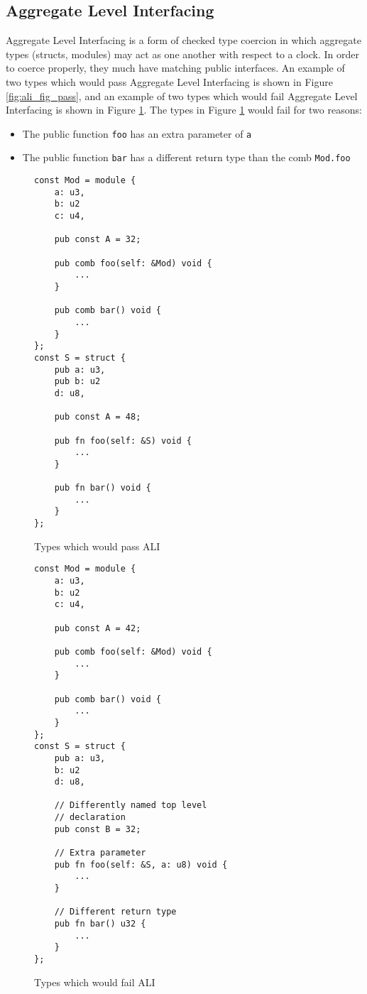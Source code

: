 \documentclass[10pt]{article}
\begin{document}
\subsection{Aggregate Level Interfacing} \label{sec:ali}
Aggregate Level Interfacing is a form of checked type coercion in which aggregate types (structs,
modules) may act as one another with respect to a clock. In order to coerce properly, they much have
matching public interfaces. An example of two types which would pass Aggregate Level Interfacing is
shown in Figure \ref{fig:ali_fig_pass}, and an example of two types which would fail Aggregate Level
Interfacing is shown in Figure \ref{fig:ali_fig_fail}. The types in Figure \ref{fig:ali_fig_fail}
would fail for two reasons:
\begin{itemize}
	\item The public function \verb|foo| has an extra parameter of \verb|a|
	\item The public function \verb|bar| has a different return type than the comb \verb|Mod.foo|
\end{itemize}

\begin{figure}[H]
	\begin{multicols}{2}
		\begin{verbatim}
const Mod = module {
    a: u3,
    b: u2
    c: u4,

    pub const A = 32;

    pub comb foo(self: &Mod) void {
        ...
    }

    pub comb bar() void {
        ...
    }
};
const S = struct {
    pub a: u3,
    pub b: u2
    d: u8,

    pub const A = 48;

    pub fn foo(self: &S) void {
        ...
    }

    pub fn bar() void {
        ...
    }
};
        \end{verbatim}
		\vspace*{-5mm}
		\caption{Types which would pass ALI}
		\label{fig:ali_fig_pass}
		\columnbreak
		\begin{verbatim}
const Mod = module {
    a: u3,
    b: u2
    c: u4,

    pub const A = 42;

    pub comb foo(self: &Mod) void {
        ...
    }

    pub comb bar() void {
        ...
    }
};
const S = struct {
    pub a: u3,
    b: u2
    d: u8,

    // Differently named top level
    // declaration
    pub const B = 32;

    // Extra parameter
    pub fn foo(self: &S, a: u8) void {
        ...
    }

    // Different return type
    pub fn bar() u32 {
        ...
    }
};
    \end{verbatim}
		\vspace*{-5mm}
		\caption{Types which would fail ALI}
		\label{fig:ali_fig_fail}
	\end{multicols}
\end{figure}
\end{document}
